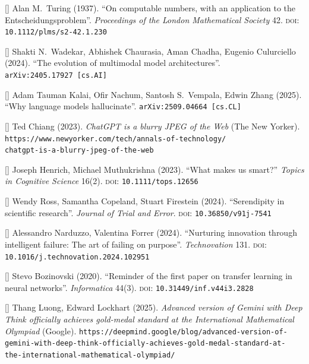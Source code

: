 \documentclass[12pt]{article}
\newcommand{\citestrut}[1]{\vphantom{[}{#1}\vphantom{]}}
\newcommand{\custombibitem}[3]{\hypertarget{#1}{[\href{#2}{\citestrut{#1}}] {#3}}}
\begin{document}
\custombibitem{Undecidability}
{https://londmathsoc.onlinelibrary.wiley.com/doi/abs/10.1112/plms/s2-42.1.230}
{Alan M.\ Turing (1937).
``On computable numbers, with an application to the Entscheidungsproblem''.
\textit{Proceedings of the London Mathematical Society} 42.
\textsc{doi}: {\tt 10.1112/plms/s2-42.1.230}}

\custombibitem{Multimodality}{https://arxiv.org/abs/2405.17927}
{Shakti N.\ Wadekar, Abhishek Chaurasia, Aman Chadha, Eugenio Culurciello (2024).
``The evolution of multimodal model architectures''.\\
{\tt arXiv:2405.17927 [cs.AI]}}

\custombibitem{Hallucinations}{https://arxiv.org/abs/2509.04664}
{Adam Tauman Kalai, Ofir Nachum, Santosh S.\ Vempala, Edwin Zhang (2025).
``Why language models hallucinate''.
{\tt arXiv:2509.04664 [cs.CL]}}

\custombibitem{Compression}
{https://www.newyorker.com/tech/annals-of-technology/chatgpt-is-a-blurry-jpeg-of-the-web}
{Ted Chiang (2023).
\textit{ChatGPT is a blurry JPEG of the Web} (The New Yorker).
{\tt https://www.newyorker.com/tech/annals-of-technology/\\chatgpt-is-a-blurry-jpeg-of-the-web}}

\custombibitem{CollectiveIntelligence}
{https://onlinelibrary.wiley.com/doi/abs/10.1111/tops.12656}
{Joseph Henrich, Michael Muthukrishna (2023).
``What makes us smart?''
\textit{Topics in Cognitive Science} 16(2).
\textsc{doi}: {\tt 10.1111/tops.12656}}

\custombibitem{Serendipity}
{https://journal.trialanderror.org/pub/serendipity-in-scientific/release/2}
{Wendy Ross, Samantha Copeland, Stuart Firestein (2024).
``Serendipity in scientific research''.
\textit{Journal of Trial and Error}.
\textsc{doi}: {\tt 10.36850/v91j-7541}}

\custombibitem{IntelligentFailure}
{https://www.sciencedirect.com/science/article/pii/S0166497224000014}
{Alessandro Narduzzo, Valentina Forrer (2024).
``Nurturing innovation through intelligent failure: The art of failing on purpose''.
\textit{Technovation} 131.
\textsc{doi}: {\tt 10.1016/j.technovation.2024.102951}}

\custombibitem{TransferLearning}
{https://www.informatica.si/index.php/informatica/article/view/2828}
{Stevo Bozinovski (2020).
``Reminder of the first paper on transfer learning in neural networks''.
\textit{Informatica} 44(3).
\textsc{doi}: {\tt 10.31449/inf.v44i3.2828}}

\custombibitem{IMO}
{https://deepmind.google/blog/advanced-version-of-gemini-with-deep-think-officially-achieves-gold-medal-standard-at-the-international-mathematical-olympiad/}
{Thang Luong, Edward Lockhart (2025).
\textit{Advanced version of Gemini with Deep Think officially achieves gold-medal
standard at the International Mathematical Olympiad} (Google).
{\tt https://deepmind.google/blog/advanced-version-of-\\
gemini-with-deep-think-officially-achieves-gold-medal-standard-at-\\
the-international-mathematical-olympiad/}}
\end{document}
